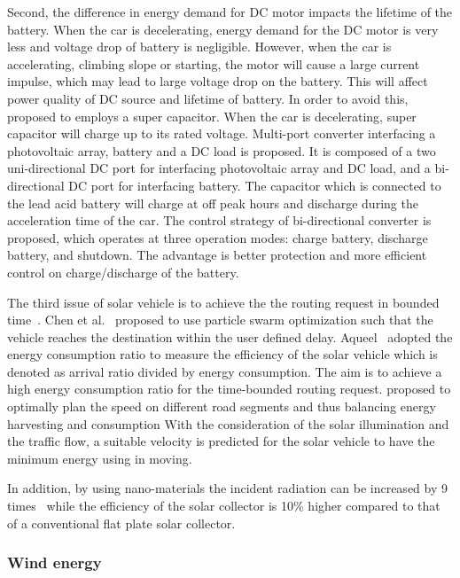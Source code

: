 Second, the difference in energy demand for DC motor impacts the lifetime of the battery. When the car is decelerating, energy demand for the DC motor is very less and voltage drop of battery is negligible. However, when the car is accelerating, climbing slope or starting, the motor will cause a large current impulse, which may lead to large voltage drop on the battery. This will affect power quality of DC source and lifetime of battery. In order to avoid this,~\cite{JX_2,JX_26,JX_67} proposed to employs a super capacitor. When the car is decelerating, super capacitor will charge up to its rated voltage. Multi-port converter interfacing a photovoltaic array, battery and a DC load is proposed. It is composed of a two uni-directional DC port for interfacing photovoltaic array and DC load, and a bi-directional DC port for interfacing battery. The capacitor which is connected to the lead acid battery will charge at off peak hours and discharge during the acceleration time of the car. The control strategy of bi-directional converter is proposed, which operates at three operation modes: charge battery, discharge battery, and shutdown. The advantage is better protection and more efficient control on charge/discharge of the battery.

The third issue of solar vehicle is to achieve the the routing request in bounded time~\cite{JX_4,JX_14,JX_17,JX_46}. Chen et al.~\cite{JX_14} proposed to use particle swarm optimization such that the vehicle reaches the destination within the user defined delay. Aqueel~\cite{JX_4} adopted the energy consumption ratio to measure the efficiency of the solar vehicle which is denoted as arrival ratio divided by energy consumption. The aim is to achieve a high energy consumption ratio for the time-bounded routing request. \cite{JX_17} proposed to optimally plan the speed on different road segments and thus balancing energy harvesting and consumption With the consideration of the solar illumination and the traffic flow, a suitable velocity is predicted for the solar vehicle to have the minimum energy using in moving.

In addition, by using nano-materials the incident radiation can be increased by 9 times~\cite{JX_1} while the efficiency of the solar collector is 10\% higher compared to that of a conventional flat plate solar collector.

\subsubsection{Wind energy}

